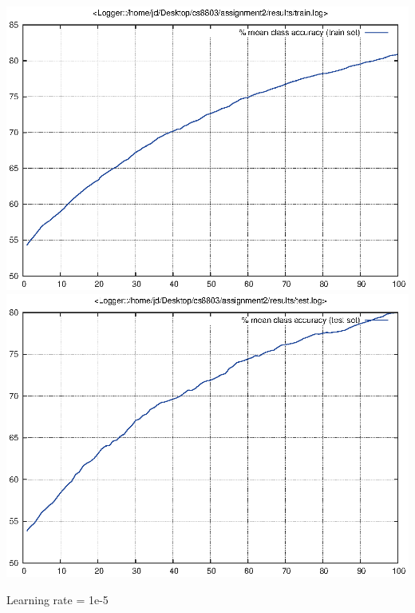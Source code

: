 \documentclass[twoside,12pt]{article}
\newcommand{\imsize}{0.5\linewidth}
\begin{document}
\includegraphics[width=\imsize]{assignment2/results/cd_lr3_train}
\includegraphics[width=\imsize]{assignment2/results/cd_lr3_test}

Learning rate = 1e-5
\end{document}
